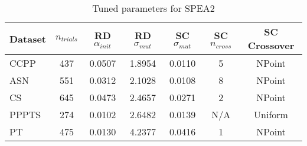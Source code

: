 \begin{table}[ht]
\centering
\caption{Tuned parameters for SPEA2}
\begin{tabular}{lcccccc}
\hline
Dataset & $n_{trials}$ & \acs{RD} $\alpha_{init}$ & \acs{RD} $\sigma_{mut}$ & \acs{SC} $\sigma_{mut}$ & \acs{SC} $n_{cross}$ & \acs{SC} Crossover \\
\hline
CCPP & 437 & 0.0507 & 1.8954 & 0.0110 & 5 & NPoint \\
ASN & 551 & 0.0312 & 2.1028 & 0.0108 & 8 & NPoint \\
CS & 645 & 0.0473 & 2.4657 & 0.0271 & 2 & NPoint \\
PPPTS & 274 & 0.0102 & 2.6482 & 0.0139 & N/A & Uniform \\
PT & 475 & 0.0130 & 4.2377 & 0.0416 & 1 & NPoint \\
\hline
\end{tabular}
\end{table}